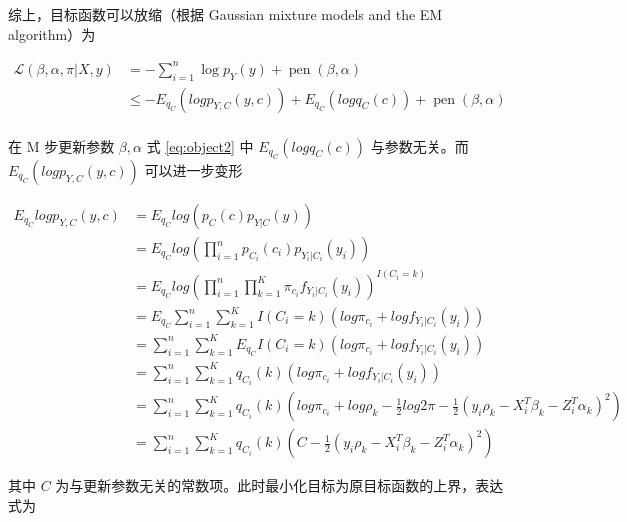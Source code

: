 \documentclass[12pt, a4paper, oneside]{article}
\numberwithin{equation}{section}
\begin{document}
综上，目标函数可以放缩（根据 Gaussian mixture models and the EM algorithm）为 

\begin{equation}
	\begin{aligned}
		\mathcal{L}(\beta,\alpha, \pi | X, y)
		&= -\sum_{i=1}^{n}\log{p_Y(y)} + \operatorname{pen}(\beta, \alpha)\\
		&\leq -E_{q_C} \left(log p_{Y,C}(y,c)\right) + E_{q_C}\left(log q_C(c)\right)+ \operatorname{pen}(\beta, \alpha)\\
	\end{aligned}
\label{eq:object2}
\end{equation}

在 M 步更新参数 $\beta, \alpha$ 式 \ref{eq:object2} 中 $E_{q_C}(log q_C(c))$ 与参数无关。而 $E_{q_C} \left(log p_{Y,C}(y,c)\right)$ 可以进一步变形

\begin{equation}
	\begin{aligned}
		E_{q_C}log p_{Y,C}(y,c) &= E_{q_C} log \left(p_C(c) p_{Y|C}(y)\right)\\
		&= E_{q_C} log \left(\prod^{n}_{i=1} p_{C_i}(c_i) p_{Y_i|C_i}(y_i) \right) \\
		&= E_{q_C} log \left(\prod^{n}_{i=1}\prod^{K}_{k=1} \pi_{c_i} f_{Y_i|C_i}(y_i) \right)^{I(C_i=k)} \\
		&= E_{q_C} \sum^{n}_{i=1}\sum^{K}_{k=1} I(C_i=k)\left( log\pi_{c_i} + log f_{Y_i|C_i}(y_i) \right) \\
		&= \sum^{n}_{i=1}\sum^{K}_{k=1} E_{q_C} I(C_i=k)\left( log\pi_{c_i} + log f_{Y_i|C_i}(y_i) \right) \\
		&= \sum^{n}_{i=1}\sum^{K}_{k=1} q_{C_i}(k)\left( log\pi_{c_i} + log f_{Y_i|C_i}(y_i) \right) \\
		&= \sum^{n}_{i=1}\sum^{K}_{k=1} q_{C_i}(k)\left(log\pi_{c_i} +log\rho_k - \frac{1}{2}log 2\pi - \frac{1}{2}(y_i\rho_k - X_i^T \beta_k - Z_i^T \alpha_k)^2\right) \\
		&= \sum_{i=1}^{n}\sum^{K}_{k=1} q_{C_i}(k)\left(C-\frac{1}{2}(y_i\rho_k - X_i^T \beta_k - Z_i^T \alpha_k)^2 \right)
	\end{aligned}
\end{equation}

其中 $C$ 为与更新参数无关的常数项。此时最小化目标为原目标函数的上界，表达式为
\end{document}
